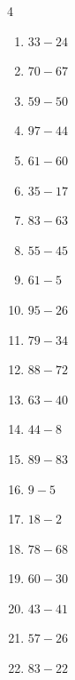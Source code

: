 \begin{multicols}{4}
\begin{enumerate}
  \item $33-24$
        \phantom{$=9$}

  \item $70-67$
        \phantom{$=3$}

  \item $59-50$
        \phantom{$=9$}

  \item $97-44$
        \phantom{$=53$}

  \item $61-60$
        \phantom{$=1$}

  \item $35-17$
        \phantom{$=18$}

  \item $83-63$
        \phantom{$=20$}

  \item $55-45$
        \phantom{$=10$}

\columnbreak %

  \item $61-5$
        \phantom{$=56$}

  \item $95-26$
        \phantom{$=69$}

  \item $79-34$
        \phantom{$=45$}

  \item $88-72$
        \phantom{$=16$}

  \item $63-40$
        \phantom{$=23$}

  \item $44-8$
        \phantom{$=36$}

  \item $89-83$
        \phantom{$=6$}

  \item $9-5$
        \phantom{$=4$}

  \item $18-2$
        \phantom{$=16$}

  \item $78-68$
        \phantom{$=10$}

  \item $60-30$
        \phantom{$=30$}

  \item $43-41$
        \phantom{$=2$}

  \item $57-26$
        \phantom{$=31$}

  \item $83-22$
        \phantom{$=61$}


\end{enumerate}
\end{multicols}
